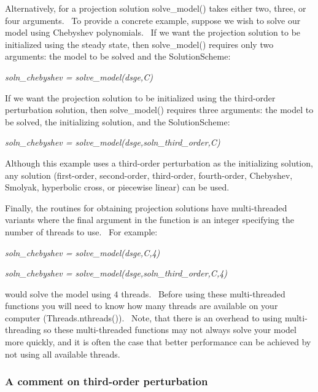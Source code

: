 \documentclass[notitlepage,11pt]{article}
\begin{document}
\bigskip

Alternatively, for a projection solution solve\_model() takes either two,
three, or four arguments. \ To provide a concrete example, suppose we wish
to solve our model using Chebyshev polynomials. \ If we want the projection
solution to be initialized using the steady state, then solve\_model()
requires only two arguments: the model to be solved and the SolutionScheme:

\bigskip

\textit{soln\_chebyshev = solve\_model(dsge,C)}

\bigskip

If we want the projection solution to be initialized using the third-order
perturbation solution, then solve\_model() requires three arguments: the
model to be solved, the initializing solution, and the SolutionScheme:

\bigskip

\textit{soln\_chebyshev = solve\_model(dsge,soln\_third\_order,C)}

\bigskip

Although this example uses a third-order perturbation as the initializing
solution, any solution (first-order, second-order, third-order,
fourth-order, Chebyshev, Smolyak, hyperbolic cross, or piecewise linear) can
be used.

Finally, the routines for obtaining projection solutions have multi-threaded
variants where the final argument in the function is an integer specifying
the number of threads to use. \ For example:

\bigskip

\textit{soln\_chebyshev = solve\_model(dsge,C,4)}

\bigskip

\bigskip \textit{soln\_chebyshev = solve\_model(dsge,soln\_third\_order,C,4)}

\bigskip

would solve the model using $4$ threads. \ Before using these multi-threaded
functions you will need to know how many threads are available on your
computer (Threads.nthreads()). \ Note, that there is an overhead to using
multi-threading so these multi-threaded functions may not always solve your
model more quickly, and it is often the case that better performance can be
achieved by not using all available threads.

\subsubsection{A comment on third-order perturbation}
\end{document}
